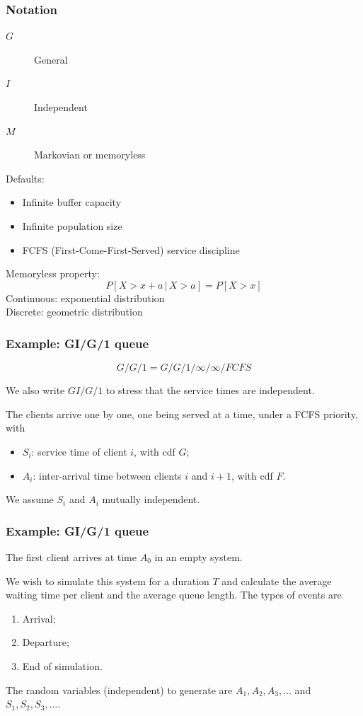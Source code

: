 \documentclass[t,usepdftitle=false]{beamer}
\begin{document}
\begin{frame}
\frametitle{Notation}

\begin{description}
	\item[$G$]
	General
	\item[$I$]
	Independent
	\item[$M$]
	Markovian or memoryless
\end{description}

\mbox{}

Defaults:
\begin{itemize}
	\item
	Infinite buffer capacity
	\item
	Infinite population size
	\item
	FCFS (First-Come-First-Served) service discipline
\end{itemize}

\mbox{}

Memoryless property:
$$
P[X > x +a \,|\, X > a] = P[X > x]
$$
Continuous: exponential distribution\\
Discrete: geometric distribution 

\end{frame}

\begin{frame}
\frametitle{Example: GI/G/1 queue}

$$
G/G/1 = G/G/1/\infty/\infty/FCFS
$$

We also write $GI/G/1$ to stress that the service times are independent.

\mbox{}

The clients arrive one by one, one being served at a time, under a FCFS priority, with
\begin{itemize}
\item
${S_i}$: service time of client $i$, with cdf $G$;
\item
${A_i}$: inter-arrival time between clients $i$ and $i+1$, with cdf $F$.
\end{itemize}
We assume $S_i$ and $A_i$ mutually independent.

\end{frame}

\begin{frame}
	\frametitle{Example: GI/G/1 queue}
	
	The first client arrives at time ${A_0}$ in an empty system.
	
	\mbox{}
	
	We wish to simulate this system for a duration ${T}$ and calculate the average waiting time per client and the average queue length. The types of events are
	\begin{enumerate}
		\item Arrival;
		\item Departure;
		\item End of simulation.
	\end{enumerate}
	The random variables (independent) to generate are $A_1, A_2, A_3, \dots$ and $S_1, S_2, S_3, \dots$.
	
\end{frame}
\end{document}
